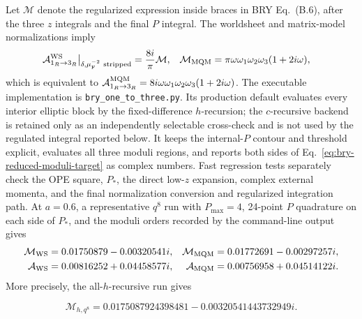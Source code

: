 \documentclass[11pt]{article}
\begin{document}
Let $\mathcal M$ denote the regularized expression inside braces in
BRY Eq.~(B.6), after the three $z$ integrals and the final $P$ integral.  The
worldsheet and matrix-model normalizations imply
\begin{align}
 \mathcal A_{1_R\to3_R}^{\rm WS}\big|_{\delta,\mu_{\rm F}^{-2}\ {\rm stripped}}
 &=\frac{8i}{\pi}\mathcal M,
 &
 \mathcal M_{\rm MQM}
 &=\pi\omega\omega_1\omega_2\omega_3(1+2i\omega),
 \label{eq:bry-reduced-moduli-target}
\end{align}
which is equivalent to
$\mathcal A_{1_R\to3_R}^{\rm MQM}
=8i\omega\omega_1\omega_2\omega_3(1+2i\omega)$.
The executable implementation is \texttt{bry\_one\_to\_three.py}.  Its
production default evaluates every interior elliptic block by the
fixed-difference $h$-recursion; the $c$-recursive backend is retained only
as an independently selectable cross-check and is not used by the regulated
integral reported below.  It keeps
the internal-$P$ contour and threshold explicit, evaluates all three moduli
regions, and reports both sides of Eq.~\eqref{eq:bry-reduced-moduli-target}
as complex numbers.  Fast regression tests separately check the OPE square,
$P_*$, the direct low-$z$ expansion, complex external momenta, and the final
normalization conversion and regularized integration path.  At $a=0.6$, a
representative $q^8$ run with
$P_{\max}=4$, 24-point $P$ quadrature on each side of $P_*$, and the moduli
orders recorded by the command-line output gives
\begin{align}
 \mathcal M_{\rm WS}&=0.01750879-0.00320541i,
 &
 \mathcal M_{\rm MQM}&=0.01772691-0.00297257i,
 \notag\\
 \mathcal A_{\rm WS}&=0.00816252+0.04458577i,
 &
 \mathcal A_{\rm MQM}&=0.00756958+0.04514122i.
 \label{eq:bry-first-regulated-numerical-result}
\end{align}
More precisely, the all-$h$-recursive run gives

\begin{equation}
 \mathcal M_{h,q^8}
 =0.0175087924398481-0.00320541443732949i.
 \label{eq:bry-h-recursion-architecture-check}
\end{equation}
\end{document}
